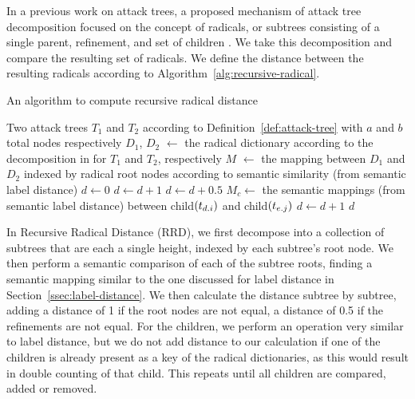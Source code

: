 In a previous work on attack trees, a proposed mechanism of attack tree decomposition focused on the concept of radicals, or subtrees consisting of a single parent, refinement, and set of children . We take this decomposition and compare the resulting set of radicals. We define the distance between the resulting radicals according to Algorithm~\ref{alg:recursive-radical}.


\begin{algorithm}
    \caption{An algorithm to compute recursive radical distance}
    \label{alg:recursive-radical}
    \begin{algorithmic}
        \State Two attack trees $T_1$ and $T_2$ according to Definition~\ref{def:attack-tree} with $a$ and $b$ total nodes respectively
        \State $D_1$, $D_2$ $\gets$ the radical dictionary according to the decomposition in  for $T_1$ and $T_2$, respectively
        \State $M$ $\gets$ the mapping between $D_1$ and $D_2$ indexed by radical root nodes according to semantic similarity (from semantic label distance)
        \State $d \gets 0$
        \State $d \gets d + 1$
        \EndIf
        \State $d \gets d + 0.5$
        \EndIf
        \State $M_c \gets$ the semantic mappings (from semantic label distance) between child$(t_{{d}.{i}})$ and child$(t_{{e}.{j}})$
        \State $d \gets d + 1$
        \EndIf
        \EndIf
        \EndFor
        \EndFor
        \State \Return $d$
    \end{algorithmic}
\end{algorithm}

In Recursive Radical Distance (RRD), we first decompose into a collection of subtrees that are each a single height, indexed by each subtree's root node. We then perform a semantic comparison of each of the subtree roots, finding a semantic mapping similar to the one discussed for label distance in Section~\ref{ssec:label-distance}. We then calculate the distance subtree by subtree, adding a distance of 1 if the root nodes are not equal, a distance of 0.5 if the refinements are not equal. For the children, we perform an operation very similar to label distance, but we do not add distance to our calculation if one of the children is already present as a key of the radical dictionaries, as this would result in double counting of that child. This repeats until all children are compared, added or removed.

